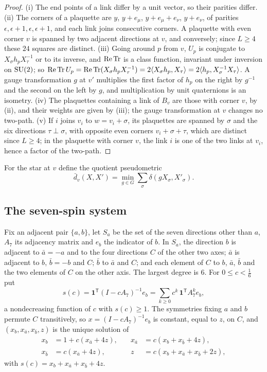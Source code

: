 \begin{proof}
(i) The end points of a link differ by a unit vector, so their parities
differ. (ii) The corners of a plaquette are $y$, $y+e_\mu$, $y+e_\mu+e_\nu$,
$y+e_\nu$, of parities $\epsilon,\epsilon+1,\epsilon,\epsilon+1$, and each
link joins consecutive corners. A plaquette with even corner $v$ is spanned by
two adjacent directions at $v$, and conversely; since $L\ge4$ these $24$
squares are distinct. (iii) Going around $p$ from $v$, $U_p$ is conjugate to
$X_\sigma h_pX_\tau^{-1}$ or to its inverse, and $\operatorname{Re}\operatorname{Tr}$ is a class function,
invariant under inversion on $\mathrm{SU}(2)$; so $\operatorname{Re}\operatorname{Tr} U_p=\operatorname{Re}\operatorname{Tr}(X_\sigma h_p
X_\tau^{-1})=2\langle X_\sigma h_p,X_\tau\rangle=2\langle h_p,X_\sigma^{-1}X_\tau\rangle$. A gauge
transformation $g$ at $v'$ multiplies the first factor of $h_p$ on the right
by $g^{-1}$ and the second on the left by $g$, and multiplication by unit
quaternions is an isometry. (iv) The plaquettes containing a link of $B_v$
are those with corner $v$, by (ii), and their weights are given by (iii); the
gauge transformation at $v$ changes no two-path. (v) If $i$ joins $v_i$ to
$w=v_i+\sigma$, its plaquettes are spanned by $\sigma$ and the six directions
$\tau\perp\sigma$, with opposite even corners $v_i+\sigma+\tau$, which are
distinct since $L\ge4$; in the plaquette with corner $v$, the link $i$ is one
of the two links at $v_i$, hence a factor of the two-path.
\end{proof}

For the star at $v$ define the quotient pseudometric
\[
\bar d_v(X,X')=\min_{g\in G}\sum_\sigma\delta(gX_\sigma,X'_\sigma).
\]

\subsection{The seven-spin system}

Fix an adjacent pair $\{a,b\}$, let $S_a$ be the set of the seven directions
other than $a$, $A_7$ its adjacency matrix and $e_b$ the indicator of $b$.
In $S_a$, the direction $b$ is adjacent to $\bar a=-a$ and to the four
directions $C$ of the other two axes; $\bar a$ is adjacent to $b$,
$\bar b=-b$ and $C$; $\bar b$ to $\bar a$ and $C$; and each element of $C$ to
$b$, $\bar a$, $\bar b$ and the two elements of $C$ on the other axis. The
largest degree is $6$. For $0\le c<\frac16$ put
\[
s(c)=\mathbf 1^{\mathsf T}(I-cA_7)^{-1}e_b=\sum_{k\ge0}c^k\,\mathbf 1^{\mathsf T}
A_7^ke_b ,
\]
a nondecreasing function of $c$ with $s(c)\ge1$. The symmetries fixing $a$ and
$b$ permute $C$ transitively, so $x=(I-cA_7)^{-1}e_b$ is constant, equal to
$z$, on $C$, and $(x_b,x_{\bar a},x_{\bar b},z)$ is the unique solution of
\begin{equation}\label{eq:sevensys}
\begin{aligned}
x_b&=1+c(x_{\bar a}+4z),&\quad x_{\bar a}&=c(x_b+x_{\bar b}+4z),\\
x_{\bar b}&=c(x_{\bar a}+4z),&\quad z&=c(x_b+x_{\bar a}+x_{\bar b}+2z),
\end{aligned}
\end{equation}
with $s(c)=x_b+x_{\bar a}+x_{\bar b}+4z$.


